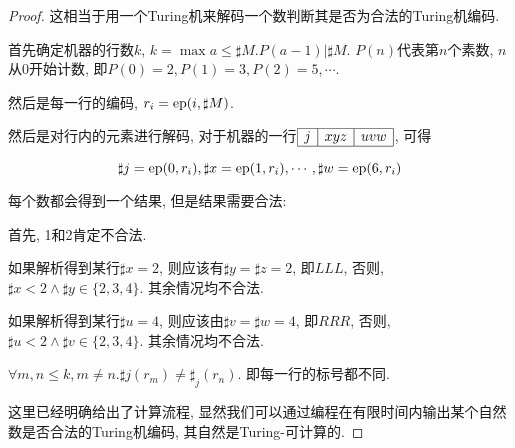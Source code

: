 \begin{proof}
	这相当于用一个Turing机来解码一个数判断其是否为合法的Turing机编码.
	
	首先确定机器的行数$k$, $k=\max a\leqslant \sharp M.P(a-1)|\sharp M$. $P(n)$代表第$n$个素数, $n$从0开始计数, 即$P(0)=2, P(1)=3, P(2)=5, \cdots$.
	
	然后是每一行的编码, $r_i=\mathrm{ep}(i,\sharp M)$.
	
	然后是对行内的元素进行解码, 对于机器的一行$\begin{array}{|c|c|c|}\hline j&xyz&uvw\\\hline\end{array}$, 可得
	
	$$\sharp j = \mathrm{ep}(0,r_i), \sharp x=\mathrm{ep}(1,r_i), \cdots, \sharp w=\mathrm{ep}(6,r_i)$$
	
	每个数都会得到一个结果, 但是结果需要合法:
	
	首先, 1和2肯定不合法.
	
	如果解析得到某行$\sharp x=2$, 则应该有$\sharp y=\sharp z=2$, 即$LLL$, 否则, $\sharp x < 2\land \sharp y\in\{2,3,4\}$. 其余情况均不合法.
	
	如果解析得到某行$\sharp u=4$, 则应该由$\sharp v=\sharp w=4$, 即$RRR$, 否则, $\sharp u < 2\land \sharp v\in\{2,3,4\}$. 其余情况均不合法.
	
	$\forall m,n\leqslant k, m\neq n. \sharp j(r_m)\neq \sharp_j(r_n)$. 即每一行的标号都不同.
	
	这里已经明确给出了计算流程, 显然我们可以通过编程在有限时间内输出某个自然数是否合法的Turing机编码, 其自然是Turing-可计算的.
\end{proof}